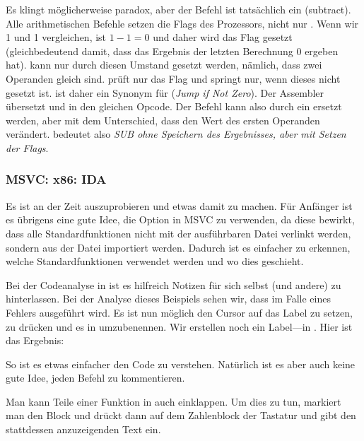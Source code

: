 \label{CMPandSUB}
Es klingt möglicherweise paradox, aber der \CMP Befehl ist tatsächlich ein \SUB (subtract).
Alle arithmetischen Befehle setzen die Flags des Prozessors, nicht nur \CMP.
Wenn wir 1 und 1 vergleichen, ist $1-1=0$ und daher wird das \ZF Flag gesetzt (gleichbedeutend damit, dass das Ergebnis
der letzten Berechnung 0 ergeben hat).
\ZF kann nur durch diesen Umstand gesetzt werden, nämlich, dass zwei Operanden gleich sind.
\JNE prüft nur das \ZF Flag und springt nur, wenn dieses nicht gesetzt ist. \JNE ist daher ein Synonym für \JNZ
(\emph{Jump if Not Zero}).
Der Assembler übersetzt \JNE und \JNZ in den gleichen Opcode.
Der \CMP Befehl kann also durch ein \SUB ersetzt werden, aber mit dem Unterschied, dass \SUB den Wert des ersten
Operanden verändert. \CMP bedeutet also \emph{SUB ohne Speichern des Ergebnisses, aber mit Setzen der Flags}.

\subsubsection{MSVC: x86: IDA}

Es ist an der Zeit \IDA auszuprobieren und etwas damit zu machen.
Für Anfänger ist es übrigens eine gute Idee, die  Option in MSVC zu verwenden, da diese bewirkt, dass alle
Standardfunktionen nicht mit der ausführbaren Datei verlinkt werden, sondern aus der Datei  importiert
werden. Dadurch ist es einfacher zu erkennen, welche Standardfunktionen verwendet werden und wo dies geschieht.

Bei der Codeanalyse in \IDA ist es hilfreich Notizen für sich selbst (und andere) zu hinterlassen.
Bei der Analyse dieses Beispiels sehen wir, dass  im Falle eines Fehlers ausgeführt wird.
Es ist nun möglich den Cursor auf das Label zu setzen,  zu drücken und es in  umzubenennen.
Wir erstellen noch ein Label---in .
Hier ist das Ergebnis:


So ist es etwas einfacher den Code zu verstehen. Natürlich ist es aber auch keine gute Idee, jeden Befehl zu
kommentieren.

Man kann Teile einer Funktion in \IDA auch einklappen. Um dies zu tun, markiert man den Block und drückt dann \q{--} auf
dem Zahlenblock der Tastatur und gibt den stattdessen anzuzeigenden Text ein.

